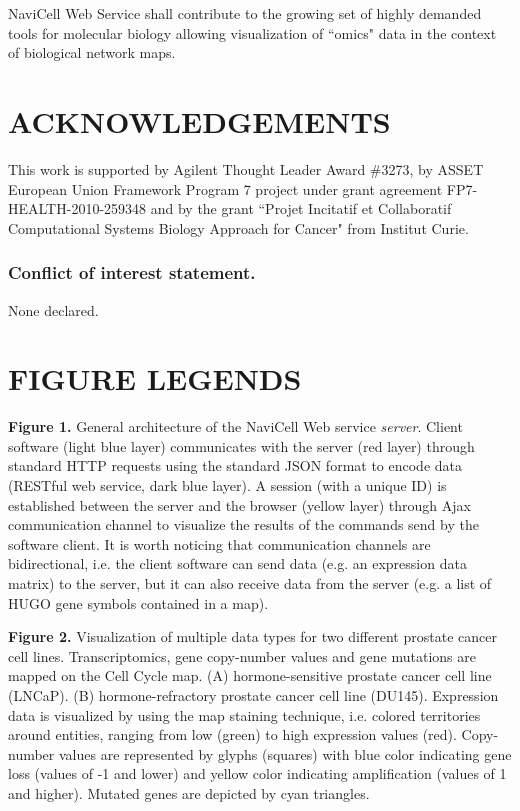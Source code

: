 \documentclass[a4,center,fleqn]{NAR}
\begin{document}
NaviCell Web Service shall contribute to the growing set of highly demanded
tools for molecular biology allowing visualization of ``omics" data in the
context of biological network maps.

\section{ACKNOWLEDGEMENTS}

This work is supported by Agilent Thought Leader Award \#3273, by ASSET European Union Framework Program 7 project under grant agreement FP7-HEALTH-2010-259348 and by the
grant ``Projet Incitatif et Collaboratif Computational Systems Biology Approach for Cancer" from Institut Curie.

\subsubsection{Conflict of interest statement.} None declared.

\section{FIGURE LEGENDS}

\textbf{Figure 1.} General architecture of the NaviCell Web service
\emph{server}. Client software (light blue layer) communicates with the server
(red layer) through standard HTTP requests using the standard JSON format to
encode data (RESTful web service, dark blue layer). A session (with a unique ID)
is established between the server and the browser (yellow layer) through
Ajax communication channel to visualize the results of the commands send by the
software client. It is worth noticing that communication channels are bidirectional, i.e.
the client software can send data (e.g. an expression data matrix) to the
server, but it can also receive data from the server (e.g. a list of HUGO
gene symbols contained in a map).

\textbf{Figure 2.} Visualization of multiple data types for two different
prostate cancer cell lines. Transcriptomics, gene copy-number values and gene
mutations \cite{barretina2012cancer} are mapped on the Cell Cycle map. (A)
hormone-sensitive prostate cancer cell line (LNCaP). (B) hormone-refractory
prostate cancer cell line (DU145). Expression data is visualized by using the
map staining technique, i.e. colored territories around entities, ranging from
low  (green) to high expression values (red).  Copy-number values are
represented by glyphs (squares) with blue color indicating gene loss (values of
-1 and lower) and yellow color indicating amplification (values of 1 and
higher). Mutated genes are depicted by cyan triangles.
\end{document}
